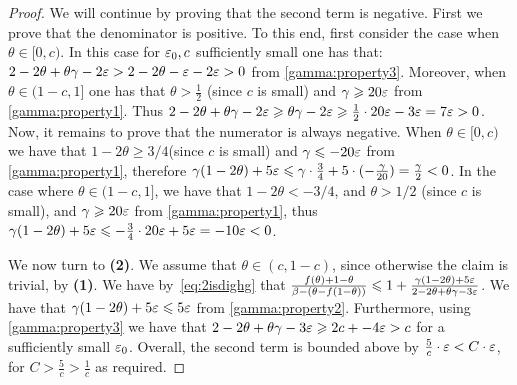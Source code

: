 \begin{proof}
We will continue by proving that the second term is negative. First we prove that the denominator is positive. To this end, first consider the case when $\theta \in [0,c)$. In this case for $\varepsilon_0, c$ sufficiently small one has that:  $2-2\theta+\theta\gamma-2\varepsilon > 2 - 2 \theta -\varepsilon -2 \varepsilon > 0$ from \cref{gamma:property3}. Moreover, when  $\theta \in (1-c, 1]$ one has that $\theta > \frac{1}{2}$ (since $c$ is small) and $\gamma \geqslant 20 \varepsilon$ from \cref{gamma:property1}. Thus $2-2\theta+\theta\gamma-2\varepsilon \geqslant \theta \gamma - 2 \varepsilon \geqslant \frac{1}{2} \cdot 20 \varepsilon -3 \varepsilon = 7 \varepsilon > 0 $. Now, it remains to prove that the numerator is always negative. When $\theta \in [0,c)$ we have that $1 - 2 \theta \geq 3 /4$(since $c$ is small) and $\gamma \leqslant -20 \varepsilon$ from \cref{gamma:property1}, therefore $\gamma (1- 2 \theta) + 5\varepsilon \leqslant \gamma \cdot \frac{3}{4}+5 \cdot (-\frac{\gamma}{20}) = \frac{\gamma}{2} < 0 $. In the case where $\theta \in (1-c, 1]$, we have that $1 - 2 \theta <- 3/4$, and $\theta > 1/2 $ (since $c$ is small), and $\gamma \geqslant 20 \varepsilon$ from \cref{gamma:property1}, thus $\gamma (1 - 2 \theta) + 5 \varepsilon \leqslant -\frac{3}{4} \cdot 20 \varepsilon  + 5\varepsilon = -10 \varepsilon < 0 $.


	We now turn to {\bf (2)}.  We assume that $\theta\in (c, 1-c)$, since otherwise the claim is trivial, by {\bf (1)}. We have by~\eqref{eq:2isdighg} that  $\frac{f(\theta)+1-\theta}{\beta-(\theta-f(1-\theta))} \leqslant 	1+\frac{\gamma(1-2\theta)+5\varepsilon}{2-2\theta+\theta\gamma-3\varepsilon}$. We have that  $\gamma (1 - 2 \theta ) + 5 \varepsilon \leqslant 5 \varepsilon$ from \cref{gamma:property2}. Furthermore, using \cref{gamma:property3} we have that $2 - 2 \theta + \theta \gamma - 3 \varepsilon  \geqslant 2c + -4 \varepsilon > c$ for a sufficiently small $\varepsilon_0$. Overall, the second term is bounded above by $\frac{5}{c} \cdot \varepsilon < C \cdot \varepsilon$, for $C > \frac{5}{c} > \frac{1}{c}$ as required.


\end{proof}
